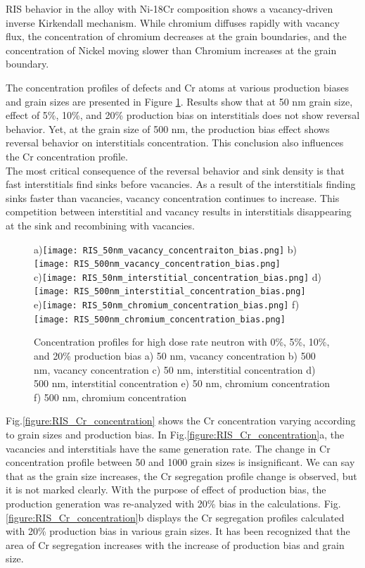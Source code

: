 \documentclass[utf8]{frontiersSCNS} %
\begin{document}
    RIS behavior in the alloy with Ni-18Cr composition shows a vacancy-driven inverse Kirkendall mechanism. While chromium diffuses rapidly with vacancy flux, the concentration of chromium decreases at the grain boundaries, and the concentration of Nickel moving slower than Chromium increases at the grain boundary.

    The concentration profiles of defects and Cr atoms at various production biases and grain sizes are presented in Figure \ref{figure:RIS}. Results show that at 50 nm grain size, effect of 5\%, 10\%, and 20\% production bias on interstitials does not show reversal behavior. Yet, at the grain size of 500 nm, the production bias effect shows reversal behavior on interstitials concentration. This conclusion also influences the Cr concentration profile.\\
    The most critical consequence of the reversal behavior and sink density is that fast interstitials find sinks before vacancies. As a result of the interstitials finding sinks faster than vacancies, vacancy concentration continues to increase. This competition between interstitial and vacancy results in interstitials disappearing at the sink and recombining with vacancies.


      \begin{figure}[h!]  %
        \centering
        a)\texttt{[image: RIS\_50nm\_vacancy\_concentraiton\_bias.png]}
        b)\texttt{[image: RIS\_500nm\_vacancy\_concentration\_bias.png]}
        \\
        c)\texttt{[image: RIS\_50nm\_interstitial\_concentration\_bias.png]}
        d)\texttt{[image: RIS\_500nm\_interstitial\_concentration\_bias.png]}
        \\
        e)\texttt{[image: RIS\_50nm\_chromium\_concentration\_bias.png]}
        f)\texttt{[image: RIS\_500nm\_chromium\_concentration\_bias.png]}
        \caption{Concentration profiles for high dose rate neutron with 0\%, 5\%, 10\%, and 20\% production bias a) 50 nm, vacancy concentration b) 500 nm, vacancy concentration c) 50 nm, interstitial concentration d) 500 nm, interstitial concentration e) 50 nm, chromium concentration f) 500 nm, chromium concentration }
        \label{figure:RIS}
      \end{figure}

\clearpage

    Fig.\ref{figure:RIS_Cr_concentration} shows the Cr concentration varying according to grain sizes and production bias. In Fig.\ref{figure:RIS_Cr_concentration}a, the vacancies and interstitials have the same generation rate. The change in Cr concentration profile between 50 and 1000 grain sizes is insignificant. We can say that as the grain size increases, the Cr segregation profile change is observed, but it is not marked clearly. With the purpose of effect of production bias, the production generation was re-analyzed with 20\% bias in the calculations. Fig.\ref{figure:RIS_Cr_concentration}b displays the Cr segregation profiles calculated with 20\% production bias in various grain sizes.  It has been recognized that the area of Cr segregation increases with the increase of production bias and grain size.
\end{document}

